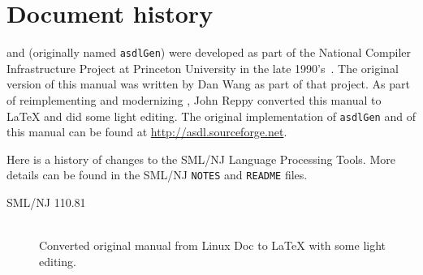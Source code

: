 %
\chapter{Document history}
\label{ch:history}

\asdl{} and \asdlgen{} (originally named \texttt{asdlGen}) were developed as part
of the National Compiler Infrastructure Project at Princeton University in the
late 1990's~\cite{usenix:zephyr-asdl}.
The original version of this manual was written by Dan Wang as part of that project.
As part of reimplementing and modernizing \asdl{}, John Reppy converted this manual
to \LaTeX{} and did some light editing.
The original implementation of \texttt{asdlGen} and of this manual can be
found at \url{http://asdl.sourceforge.net}.

Here is a history of changes to the SML/NJ Language Processing Tools.
More details can be found in the SML/NJ \texttt{NOTES} and \texttt{README} files.
\begin{description}
  \item[SML/NJ 110.81]
    \mbox{}\\[0.5em]
    Converted original manual from Linux Doc to \LaTeX{} with some light editing.
\end{description}%
